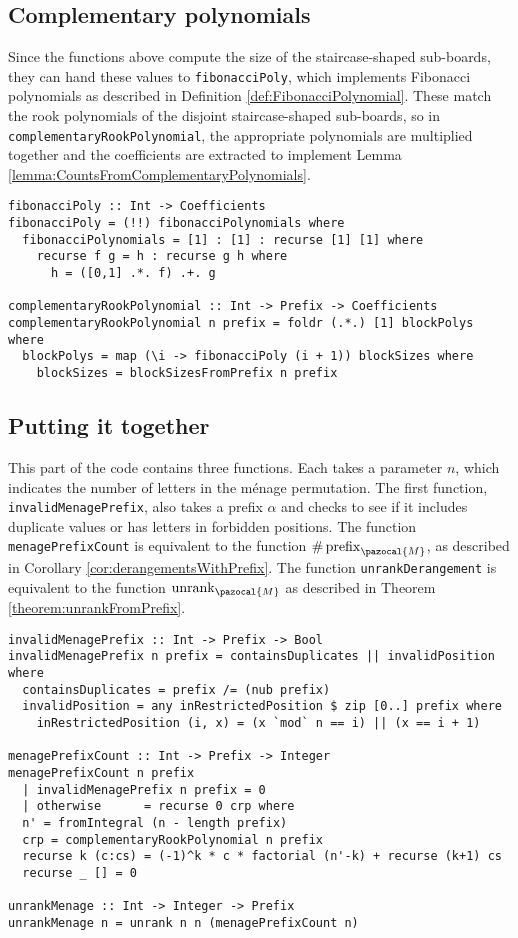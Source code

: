 \subsection{Complementary polynomials}
Since the functions above compute the size of the staircase-shaped
sub-boards, they can hand these values to \texttt{fibonacciPoly}, which
implements Fibonacci polynomials as described in
Definition \ref{def:FibonacciPolynomial}. These match the rook polynomials of
the disjoint staircase-shaped sub-boards, so in
\texttt{complementaryRookPolynomial}, the appropriate polynomials are multiplied
together and the coefficients are extracted to implement
Lemma \ref{lemma:CountsFromComplementaryPolynomials}.
\begin{singlespace}\begin{verbatim}
fibonacciPoly :: Int -> Coefficients
fibonacciPoly = (!!) fibonacciPolynomials where
  fibonacciPolynomials = [1] : [1] : recurse [1] [1] where
    recurse f g = h : recurse g h where
      h = ([0,1] .*. f) .+. g

complementaryRookPolynomial :: Int -> Prefix -> Coefficients
complementaryRookPolynomial n prefix = foldr (.*.) [1] blockPolys where
  blockPolys = map (\i -> fibonacciPoly (i + 1)) blockSizes where
    blockSizes = blockSizesFromPrefix n prefix
\end{verbatim}\end{singlespace}

\subsection{Putting it together}
This part of the code contains three functions.
Each takes a parameter $n$, which indicates the number of letters in the
m\'enage permutation.
The first function, \texttt{invalidMenagePrefix}, also takes a prefix
$\alpha$ and checks to see if it includes duplicate values or has
letters in forbidden positions.
The function \texttt{menagePrefixCount}
is equivalent to the function $\#\operatorname{prefix}_\pazocal{M}$,
as described in Corollary \ref{cor:derangementsWithPrefix}.
The function \texttt{unrankDerangement} is equivalent to the function
$\operatorname{unrank}_\pazocal{M}$ as described in
Theorem \ref{theorem:unrankFromPrefix}.
\begin{singlespace}\begin{verbatim}
invalidMenagePrefix :: Int -> Prefix -> Bool
invalidMenagePrefix n prefix = containsDuplicates || invalidPosition where
  containsDuplicates = prefix /= (nub prefix)
  invalidPosition = any inRestrictedPosition $ zip [0..] prefix where
    inRestrictedPosition (i, x) = (x `mod` n == i) || (x == i + 1)

menagePrefixCount :: Int -> Prefix -> Integer
menagePrefixCount n prefix
  | invalidMenagePrefix n prefix = 0
  | otherwise      = recurse 0 crp where
  n' = fromIntegral (n - length prefix)
  crp = complementaryRookPolynomial n prefix
  recurse k (c:cs) = (-1)^k * c * factorial (n'-k) + recurse (k+1) cs
  recurse _ [] = 0

unrankMenage :: Int -> Integer -> Prefix
unrankMenage n = unrank n n (menagePrefixCount n)
\end{verbatim}\end{singlespace}

